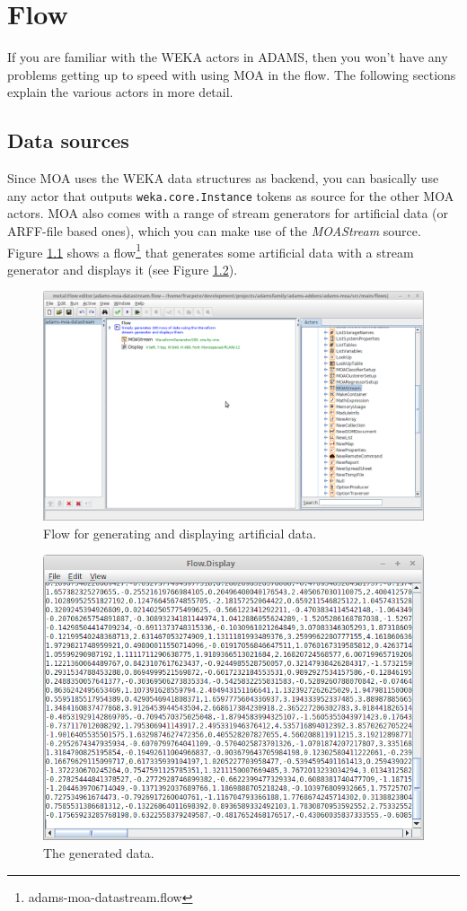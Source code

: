 \documentclass[a4paper]{book}
\begin{document}
\chapter{Flow}
If you are familiar with the WEKA actors in ADAMS, then you won't have any
problems getting up to speed with using MOA in the flow. The following sections
explain the various actors in more detail.

\section{Data sources}
Since MOA uses the WEKA data structures as backend, you can basically use any
actor that outputs \texttt{weka.core.Instance} tokens as source for the other
MOA actors. MOA also comes with a range of stream generators for artificial
data (or ARFF-file based ones), which you can make use of the 
\textit{MOAStream} source. Figure \ref{moa-stream-flow} shows a 
flow\footnote{adams-moa-datastream.flow} that generates some artificial data
with a stream generator and displays it (see Figure \ref{moa-stream-output}).

\begin{figure}[htb]
  \centering
  \includegraphics[width=12.0cm]{images/moa-stream-flow.png}
  \caption{Flow for generating and displaying artificial data.}
  \label{moa-stream-flow}
\end{figure}

\begin{figure}[htb]
  \centering
  \includegraphics[width=12.0cm]{images/moa-stream-output.png}
  \caption{The generated data.}
  \label{moa-stream-output}
\end{figure}
\end{document}
